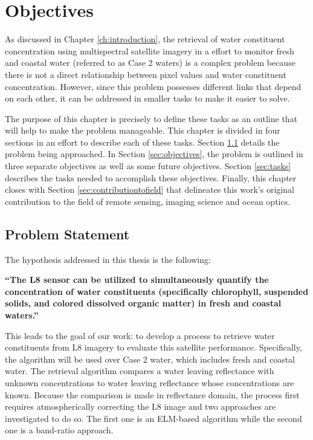 \chapter{Objectives}
\label{ch:objectives}

As discussed in Chapter \ref{ch:introduction},  the retrieval of water constituent concentration using multispectral satellite imagery in a effort to monitor fresh and coastal water (referred to as Case 2 waters) is a complex problem because there is not a direct relationship between pixel values and water constituent concentration. However, since this problem possesses different links that depend on each other, it can be addressed in smaller tasks to make it easier to solve. 

The purpose of this chapter is precisely to define these tasks as an outline that will help to make the problem manageable. This chapter is divided in four sections in an effort to describe each of these tasks. Section \ref{sec:problemstatement} details the problem being approached. In Section \ref{sec:objectives}, the problem is outlined in {\color{red} three} separate objectives as well as some future objectives. Section \ref{sec:tasks} describes the tasks needed to accomplish these objectives. Finally, this chapter closes with Section \ref{sec:contributiontofield} that delineates this work's original contribution to the field of remote sensing, imaging science and ocean optics. 
\section{Problem Statement}
\label{sec:problemstatement}
The hypothesis addressed in this thesis is the following: 

{ \bf ``The L8 sensor can be utilized to simultaneously quantify the concentration of water constituents (specifically chlorophyll, { \color{red} suspended solids}, and colored dissolved organic matter) in fresh and coastal waters.''} 

This leads to the goal of our work: to develop a process to retrieve water constituents from L8 imagery to evaluate this satellite performance. Specifically, the algorithm will be used over Case 2 water, which includes fresh and coastal water. The retrieval algorithm compares a water leaving reflectance with unknown concentrations to water leaving reflectance whose concentrations are known. Because the comparison is made in reflectance domain, the process first requires atmospherically correcting the L8 image and two approaches are investigated to do so. The first one is an ELM-based algorithm while the second one is a { band-ratio approach}.

